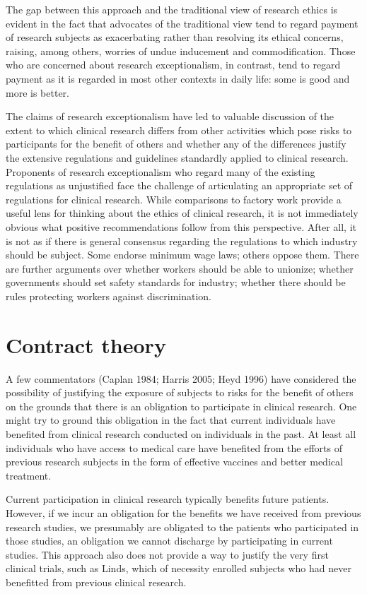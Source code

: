 \documentclass[12p]{article}
\begin{document}
The gap between this approach and the traditional view of research ethics is evident in the fact that advocates of the traditional view tend to regard payment of research subjects as exacerbating rather than resolving its ethical concerns, raising, among others, worries of undue inducement and commodification. Those who are concerned about research exceptionalism, in contrast, tend to regard payment as it is regarded in most other contexts in daily life: some is good and more is better.

The claims of research exceptionalism have led to valuable discussion of the extent to which clinical research differs from other activities which pose risks to participants for the benefit of others and whether any of the differences justify the extensive regulations and guidelines standardly applied to clinical research. Proponents of research exceptionalism who regard many of the existing regulations as unjustified face the challenge of articulating an appropriate set of regulations for clinical research. While comparisons to factory work provide a useful lens for thinking about the ethics of clinical research, it is not immediately obvious what positive recommendations follow from this perspective. After all, it is not as if there is general consensus regarding the regulations to which industry should be subject. Some endorse minimum wage laws; others oppose them. There are further arguments over whether workers should be able to unionize; whether governments should set safety standards for industry; whether there should be rules protecting workers against discrimination.

\section{Contract theory}

 A few commentators (Caplan 1984; Harris 2005; Heyd 1996) have considered the possibility of justifying the exposure of subjects to risks for the benefit of others on the grounds that there is an obligation to participate in clinical research. One might try to ground this obligation in the fact that current individuals have benefited from clinical research conducted on individuals in the past. At least all individuals who have access to medical care have benefited from the efforts of previous research subjects in the form of effective vaccines and better medical treatment.

Current participation in clinical research typically benefits future patients. However, if we incur an obligation for the benefits we have received from previous research studies, we presumably are obligated to the patients who participated in those studies, an obligation we cannot discharge by participating in current studies. This approach also does not provide a way to justify the very first clinical trials, such as Linds, which of necessity enrolled subjects who had never benefitted from previous clinical research.
\end{document}
